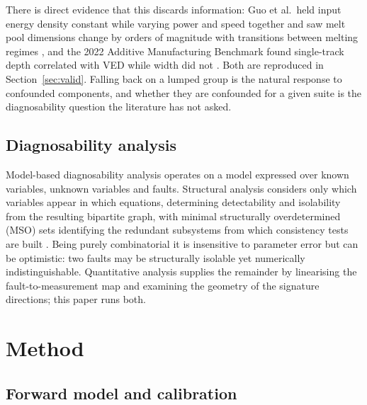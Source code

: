 \documentclass[preprint,times]{elsarticle}
\begin{document}
There is direct evidence that this discards information: Guo et al.\ held input
energy density constant while varying power and speed together and saw melt pool
dimensions change by orders of magnitude with transitions between melting
regimes \cite{Guo2019}, and the 2022 Additive Manufacturing Benchmark found
single-track depth correlated with VED while width did not \cite{Weaver2024}.
Both are reproduced in Section~\ref{sec:valid}. Falling back on a lumped group is
the natural response to confounded components, and whether they are confounded
for a given suite is the diagnosability question the literature has not asked.

\subsection{Diagnosability analysis}

Model-based diagnosability analysis operates on a model expressed over known
variables, unknown variables and faults. Structural analysis considers only which
variables appear in which equations, determining detectability and isolability
from the resulting bipartite graph, with minimal structurally overdetermined
(MSO) sets identifying the redundant subsystems from which consistency tests are
built \cite{Krysander2008}. Being purely combinatorial it is insensitive to
parameter error but can be optimistic: two faults may be structurally isolable
yet numerically indistinguishable. Quantitative analysis supplies the remainder
by linearising the fault-to-measurement map and examining the geometry of the
signature directions; this paper runs both.

\section{Method}

\subsection{Forward model and calibration}
\end{document}

